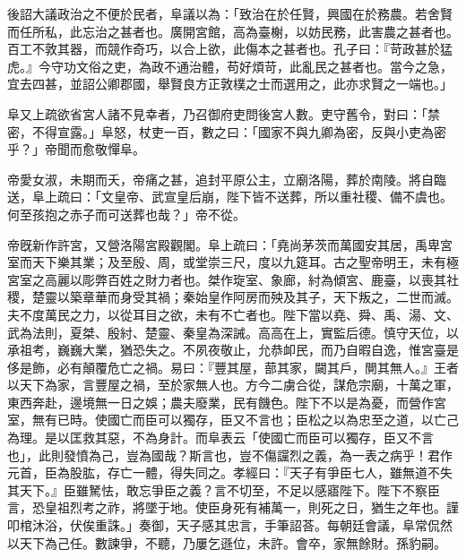 \begin{pinyinscope}
後詔大議政治之不便於民者，阜議以為：「致治在於任賢，興國在於務農。若舍賢而任所私，此忘治之甚者也。廣開宮館，高為臺榭，以妨民務，此害農之甚者也。百工不敦其器，而競作奇巧，以合上欲，此傷本之甚者也。孔子曰：『苛政甚於猛虎。』今守功文俗之吏，為政不通治體，苟好煩苛，此亂民之甚者也。當今之急，宜去四甚，並詔公卿郡國，舉賢良方正敦樸之士而選用之，此亦求賢之一端也。」

阜又上疏欲省宮人諸不見幸者，乃召御府吏問後宮人數。吏守舊令，對曰：「禁密，不得宣露。」阜怒，杖吏一百，數之曰：「國家不與九卿為密，反與小吏為密乎？」帝聞而愈敬憚阜。

帝愛女淑，未期而夭，帝痛之甚，追封平原公主，立廟洛陽，葬於南陵。將自臨送，阜上疏曰：「文皇帝、武宣皇后崩，陛下皆不送葬，所以重社稷、備不虞也。何至孩抱之赤子而可送葬也哉？」帝不從。

帝旣新作許宮，又營洛陽宮殿觀閣。阜上疏曰：「堯尚茅茨而萬國安其居，禹卑宮室而天下樂其業；及至殷、周，或堂崇三尺，度以九筵耳。古之聖帝明王，未有極宮室之高麗以彫弊百姓之財力者也。桀作琁室、象廊，紂為傾宮、鹿臺，以喪其社稷，楚靈以築章華而身受其禍；秦始皇作阿房而殃及其子，天下叛之，二世而滅。夫不度萬民之力，以從耳目之欲，未有不亡者也。陛下當以堯、舜、禹、湯、文、武為法則，夏桀、殷紂、楚靈、秦皇為深誡。高高在上，實監后德。慎守天位，以承祖考，巍巍大業，猶恐失之。不夙夜敬止，允恭卹民，而乃自暇自逸，惟宮臺是侈是飾，必有顛覆危亡之禍。易曰：『豐其屋，蔀其家，闚其戶，閴其無人。』王者以天下為家，言豐屋之禍，至於家無人也。方今二虜合從，謀危宗廟，十萬之軍，東西奔赴，邊境無一日之娛；農夫廢業，民有饑色。陛下不以是為憂，而營作宮室，無有已時。使國亡而臣可以獨存，臣又不言也；臣松之以為忠至之道，以亡己為理。是以匡救其惡，不為身計。而阜表云「使國亡而臣可以獨存，臣又不言也」，此則發憤為己，豈為國哉？斯言也，豈不傷讜烈之義，為一表之病乎！君作元首，臣為股肱，存亡一體，得失同之。孝經曰：『天子有爭臣七人，雖無道不失其天下。』臣雖駑怯，敢忘爭臣之義？言不切至，不足以感寤陛下。陛下不察臣言，恐皇祖烈考之祚，將墜于地。使臣身死有補萬一，則死之日，猶生之年也。謹叩棺沐浴，伏俟重誅。」奏御，天子感其忠言，手筆詔荅。每朝廷會議，阜常侃然以天下為己任。數諫爭，不聽，乃屢乞遜位，未許。會卒，家無餘財。孫豹嗣。


\end{pinyinscope}